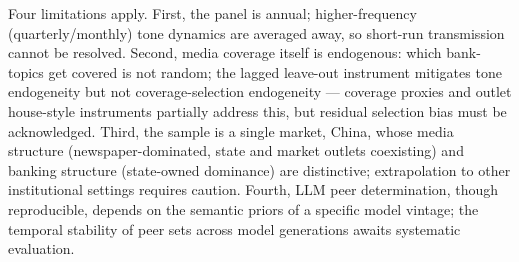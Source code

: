 Four limitations apply. First, the panel is annual; higher-frequency (quarterly/monthly) tone
dynamics are averaged away, so short-run transmission cannot be resolved. Second, media
coverage itself is endogenous: which bank-topics get covered is not random; the lagged
leave-out instrument mitigates tone endogeneity but not coverage-selection endogeneity --- coverage
proxies and outlet house-style instruments partially address this, but residual selection bias
must be acknowledged. Third, the sample is a single market, China, whose media structure
(newspaper-dominated, state and market outlets coexisting) and banking structure (state-owned
dominance) are distinctive; extrapolation to other institutional settings requires caution.
Fourth, LLM peer determination, though reproducible, depends on the semantic priors of a
specific model vintage; the temporal stability of peer sets across model generations awaits
systematic evaluation. 

\printbibliography


